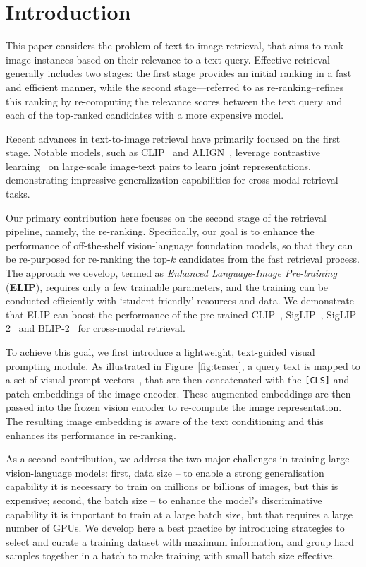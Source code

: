 \section{Introduction}
\label{sec:intro}
This paper considers the problem of text-to-image retrieval, 
that aims to rank image instances based on their relevance to a text query. 
Effective retrieval generally includes two stages: the first stage provides an initial ranking in a fast and efficient manner, while the second stage—referred to as re-ranking--refines this ranking by re-computing the relevance scores between the text query and each of the top-ranked candidates with a more expensive model.

Recent advances in text-to-image retrieval have primarily focused on the first stage. Notable models, such as CLIP~\cite{radford2021learning} and ALIGN~\cite{jia2021scaling}, leverage contrastive learning~\cite{oord2018representation} on large-scale image-text pairs to learn joint representations, demonstrating impressive generalization capabilities for cross-modal retrieval tasks.


Our primary contribution here focuses on the second stage of the retrieval pipeline, namely, the re-ranking. Specifically, our goal is to enhance the performance of off-the-shelf vision-language foundation models, so that they can be re-purposed for re-ranking the top-$k$ candidates from the fast retrieval process. 
The approach we develop, termed as {\em Enhanced Language-Image Pre-training} ({\bf ELIP}), requires only a few trainable parameters, and the training can be conducted efficiently with `student friendly' resources and data. 
We demonstrate that ELIP can boost the performance of the pre-trained CLIP~\cite{radford2021learning}, SigLIP~\cite{zhai2023siglip}, SigLIP-2~\cite{tschannen2025siglip2} and BLIP-2~\cite{li2023blip} for cross-modal retrieval.

To achieve this goal, we first introduce a lightweight, text-guided visual prompting module. As illustrated in Figure~\ref{fig:teaser}, a query text is mapped to a set of visual prompt vectors~\cite{jia2022visual}, that are then concatenated with the \texttt{[CLS]} and patch embeddings of the image encoder. These augmented embeddings are then passed into the frozen vision encoder to re-compute the image representation. The resulting image embedding is aware of the text conditioning and this enhances its performance in re-ranking.

As a second contribution, we address the two major challenges in training large vision-language models: first, data size -- to enable a strong generalisation capability it is necessary to train on millions or billions of images, but this is expensive; second, the batch size -- to enhance the model's discriminative capability it is important to train at a large batch size, but that requires a large number of GPUs. 
We develop here a best practice by introducing strategies to select and curate a training dataset with maximum information, and group hard samples together in a batch to make training with small batch size effective.

